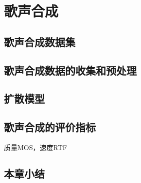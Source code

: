 \chapter{歌声合成}
\section{歌声合成数据集}
\section{歌声合成数据的收集和预处理}
\section{扩散模型}
\section{歌声合成的评价指标}
质量MOS，速度RTF
\section{本章小结}
